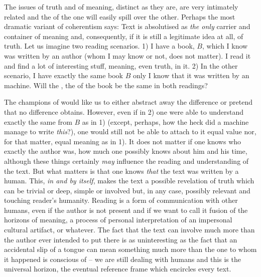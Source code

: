 \pa The issues of truth and of meaning, distinct as they are, are very
intimately related and the  of the one will easily spill over
the other. Perhaps the most dramatic variant of coherentism says:  Text is absolutised as
{\em the only} carrier and container of meaning and, consequently, if it is
still a legitimate idea at all, of truth.  Let us imagine two reading
scenarios.  1) I have a book, $B$, which I know was written by an author (whom I
may know or not, does not matter).  I read it and find a lot of interesting
stuff, meaning, even truth, in it.  2) In the other scenario, I have exactly the
same book $B$ only I know that it was written by an  machine.
Will the , the  of the book be the same in both
readings?

The champions of  would like us to either abstract away the
difference or pretend that no difference obtains.  However, even if in 2) one
were able to understand exactly the same from $B$ as in 1) (except, perhaps, how
the heck did a machine manage to write {\em this}?), one would still not be able
to attach to it equal value nor, for that matter, equal meaning as in 1).  It
does not matter if one knows who exactly the author was, how much one possibly
knows about him and his time, although these things {certainly} {\em may}
influence the reading and understanding of the text.  But what matters is that
one knows {\em that} the text was written by a human.  This, {\em in and by
  itself}, makes the text a possible revelation of truth which can be trivial or
deep, simple or involved but, in any case, possibly relevant and touching
reader's humanity.  Reading is a form of communication with other humans, even
if the author is not present and if we want to call it fusion of the horizons of
meaning, a process of personal interpretation of an
impersonal cultural artifact, or whatever.  The fact that the text can involve
much more than the author ever intended to put there is as uninteresting as the
fact that an accidental slip of a tongue can mean something much more than the
one to whom it happened is conscious of -- we are still dealing with humans and
this is the universal horizon, the eventual reference frame which encircles
every text.


